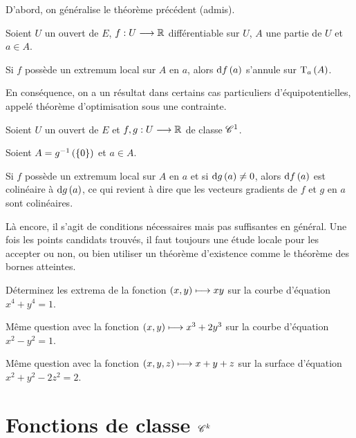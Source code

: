 D'abord, on généralise le théorème précédent (admis).

\begin{prop}
Soient \(U\) un ouvert de \(E\), \(f:U\longrightarrow\mathbb{R}\) différentiable sur \(U\), \(A\) une partie de \(U\) et \(a\in A\).

Si \(f\) possède un extremum local sur \(A\) en \(a\), alors \(\odif{f}\paren{a}\) s'annule sur \(\operatorname{T}_{a}\left(A\right)\).
\end{prop}

En conséquence, on a un résultat dans certains cas particuliers d'équipotentielles, appelé théorème d'optimisation sous une contrainte.

\begin{prop}
Soient \(U\) un ouvert de \(E\) et \(f,g:U\longrightarrow\mathbb{R}\) de classe \(\mathscr{C}^{1}\).

Soient \(A=g^{-1}\left(\left\lbrace0\right\rbrace\right)\) et \(a\in A\).

Si \(f\) possède un extremum local sur \(A\) en \(a\) et si \(\odif{g}\paren{a}\not=0\), alors \(\odif{f}\paren{a}\) est colinéaire à \(\odif{g}\paren{a}\), ce qui revient à dire que les vecteurs gradients de \(f\) et \(g\) en \(a\) sont colinéaires.
\end{prop}

\begin{rem}
Là encore, il s'agit de conditions nécessaires mais pas suffisantes en général. Une fois les points candidats trouvés, il faut toujours une étude locale pour les accepter ou non, ou bien utiliser un théorème d'existence comme le théorème des bornes atteintes.
\end{rem}

\begin{exo}
Déterminez les extrema de la fonction \(\left(x,y\right)\longmapsto xy\) sur la courbe d'équation \(x^4+y^4=1\).
\end{exo}

\begin{exo}
Même question avec la fonction \(\left(x,y\right)\longmapsto x^3+2y^3\) sur la courbe d'équation \(x^2-y^2=1\).
\end{exo}

\begin{exo}
Même question avec la fonction \(\left(x,y,z\right)\longmapsto x+y+z\) sur la surface d'équation \(x^2+y^2-2z^2=2\).
\end{exo}

\section{Fonctions de classe \(\mathscr{C}^{k}\)}

